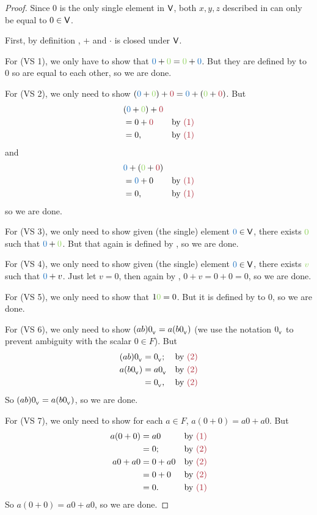 \begin{proof}
Since \(0\) is the only single element in \(\textsf{V}\), both \(x, y, z\) described in  can only be equal to \(0 \in \textsf{V}\).

First, by definition , \(+\) and \(\cdot\) is closed under \(\textsf{V}\).

For (VS 1), we only have to show that \(\BLUE{0} + \GREEN{0} = \GREEN{0} + \BLUE{0}\).
But they are defined by  to \(0\) so are equal to each other, so we are done.

For (VS 2), we only need to show \((\BLUE{0} + \GREEN{0}) + \MAROON{0} = \BLUE{0} + (\GREEN{0} + \MAROON{0})\).
But
\begin{align*}
    & (\BLUE{0} + \GREEN{0}) + \MAROON{0} \\
    & = 0 + \MAROON{0} & \text{by \MAROON{(1)}} \\
    & = 0, & \text{by \MAROON{(1)}}
\end{align*}
and
\begin{align*}
    & \BLUE{0} + (\GREEN{0} + \MAROON{0}) \\
    & = \BLUE{0} + 0 & \text{by \MAROON{(1)}} \\
    & = 0, & \text{by \MAROON{(1)}}
\end{align*}
so we are done.

For (VS 3), we only need to show given (the single) element \(\BLUE{0} \in \V\), there exists \(\GREEN{0}\) such that \(\BLUE{0} + \GREEN{0}\).
But that again is defined by , so we are done.

For (VS 4), we only need to show given (the single) element \(\BLUE{0} \in \V\), there exists \(\GREEN{v}\) such that \(\BLUE{0} + v\).
Just let \(v = 0\), then again by , \(0 + v = 0 + 0 = 0\), so we are done.

For (VS 5), we only need to show that \(1 \GREEN{0} = 0\).
But it is defined by  to \(0\), so we are done.

For (VS 6), we only need to show \((ab)0_{_{\textsf{V}}} = a(b0_{_{\textsf{V}}})\) (we use the notation \(0_{_{\textsf{V}}}\) to prevent ambiguity with the scalar \(0 \in F\)).
But
\begin{align*}
    (ab)\OV & = \OV; & \text{by \MAROON{(2)}} \\
    a(b\OV) & = a\OV & \text{by \MAROON{(2)}} \\
            & = \OV, & \text{by \MAROON{(2)}}
\end{align*}
So \((ab)0_{_{\textsf{V}}} = a(b0_{_{\textsf{V}}})\), so we are done.

For (VS 7), we only need to show for each \(a \in F\), \(a(0 + 0) = a0 + a0\).
But
\begin{align*}
    a(0 + 0) & = a0 & \text{by \MAROON{(1)}} \\
             & = 0; & \text{by \MAROON{(2)}} \\
     a0 + a0 & = 0 + a0 & \text{by \MAROON{(2)}} \\
             & = 0 + 0 & \text{by \MAROON{(2)}} \\
             & = 0. & \text{by \MAROON{(1)}}
\end{align*}
So \(a(0 + 0) = a0 + a0\), so we are done.


\end{proof}
